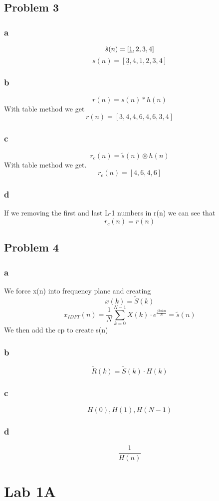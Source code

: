 \documentclass[a4paper,11pt]{article}
\begin{document}
\subsection{Problem 3}
\subsubsection{a}
\[
\Tilde{s}(n) = [\underline{1}, 2, 3, 4]
\]
\[
s(n) = [\underline{3}, 4, 1, 2, 3, 4]
\]
\subsubsection{b}
\[
r(n) = s(n)*h(n)
\]
With table method we get
\[
r(n) = [3, 4, 4, 6, 4, 6, 3, 4]
\]
\subsubsection{c}
\[
r_c(n) = \tilde{s}(n) \circledast h(n)
\]
With table method we get.
\[
r_c(n) = [4, 6, 4, 6]
\]
\subsubsection{d}
If we removing the first and last L-1 numbers in r(n) we can see that 
\[
r_c(n) = r(n)
\]
\subsection{Problem 4}
\subsubsection{a}
We force x(n) into frequency plane and creating 
\[
x(k) = \tilde{S}(k)
\]
\[
x_{IDFT}(n) = \frac{1}{N} \sum_{k=0}^{N-1} X(k) \cdot e^{\frac{j2\pi k n}{N}} = \tilde{s}(n)
\]
We then add the cp to create s(n)
\subsubsection{b}
\[
\tilde{R}(k) = \tilde{S}(k) \cdot H(k)
\]
\subsubsection{c}
\[
H(0), H(1), H(N-1)
\]
\subsubsection{d}
\[
\frac{1}{H(n)}
\]
\section{Lab 1A}
\end{document}
